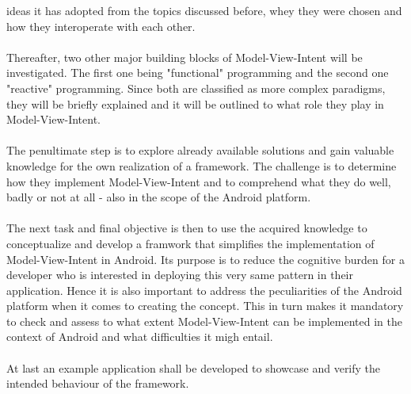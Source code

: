 ideas it has adopted from the topics discussed before, whey they were chosen and how they interoperate with each other.
\\
\\
Thereafter, two other major building blocks of Model-View-Intent will be investigated. The first one being "functional" programming and the second one "reactive" programming.
Since both are classified as more complex paradigms, they will be briefly explained and it will be outlined to what role they play in Model-View-Intent.
\\
\\
The penultimate step is to explore already available solutions and gain valuable knowledge for the own realization of a framework. The challenge is to determine
how they implement Model-View-Intent and to comprehend what they do well, badly or not at all - also in the scope of the Android platform.
\\
\\
The next task and final objective is then to use the acquired knowledge to conceptualize and develop a framwork that simplifies the implementation of Model-View-Intent in Android. 
Its purpose is to reduce the cognitive burden for a developer who is interested in deploying this very same pattern in their application. Hence it is also important to address the 
peculiarities of the Android platform when it comes to creating the concept. This in turn makes it mandatory to check and assess to what extent Model-View-Intent can be implemented 
in the context of Android and what difficulties it migh entail.
\\
\\
At last an example application shall be developed to showcase and verify the intended behaviour of the framework.